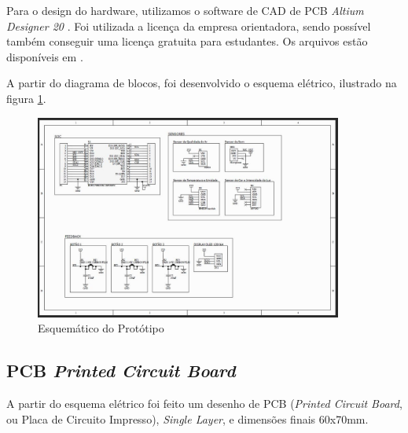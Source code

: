 \documentclass[../monografia.tex]{subfiles}
\begin{document}
Para o design do hardware, utilizamos o software de CAD de PCB \textit{Altium Designer 20} \cite{altium}. Foi utilizada a licença da empresa orientadora, sendo possível também conseguir uma licença gratuita para estudantes. Os arquivos estão disponíveis em \cite{git_hw}. 

A partir do diagrama de blocos, foi desenvolvido o esquema elétrico, ilustrado na figura \ref{fig:img2}.

\begin{figure}[h]
	\includegraphics[width=0.9\textwidth]{sch}
	\caption{Esquemático do Protótipo}
	\label{fig:img2}
\end{figure}

\subsection{PCB \textit{Printed Circuit Board}}

A partir do esquema elétrico foi feito um desenho de PCB (\textit{Printed Circuit Board}, ou Placa de Circuito Impresso), \textit{Single Layer}, e dimensões finais 60x70mm. 
\end{document}

